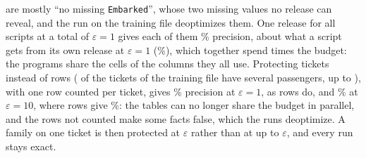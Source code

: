 are mostly ``no missing \texttt{Embarked}'', whose two missing values no release can reveal, and the run on
the training file deoptimizes them. One release for all \PrivTitanicScripts{} scripts at a total of
$\varepsilon = 1$ gives each of them \PrivCorpTitanicEpsOnePrecision\% precision, about what a script gets
from its own release at $\varepsilon = 1$ (\PrivProgTitanicEpsOnePrecision\%), which together spend
\PrivTitanicScripts{} times the budget: the programs share the cells of the columns they all use.
Protecting tickets instead of rows (\PrivTicketGroups{} of the \PrivTicketCount{} tickets of the training file
have several passengers, up to \PrivTicketMax{}), with one row counted per ticket, gives
\PrivUnitTitanicEpsOnePrecision\% precision at $\varepsilon = 1$, as rows do, and
\PrivUnitTitanicEpsTenPrecision\% at $\varepsilon = 10$, where rows give \PrivProgTitanicEpsTenPrecision\%: the
tables can no longer share the budget in parallel, and the rows not counted make some facts false, which
the runs deoptimize. A family on one ticket is then protected at $\varepsilon$ rather than at up to
\PrivTicketMax$\varepsilon$, and every run stays exact.

